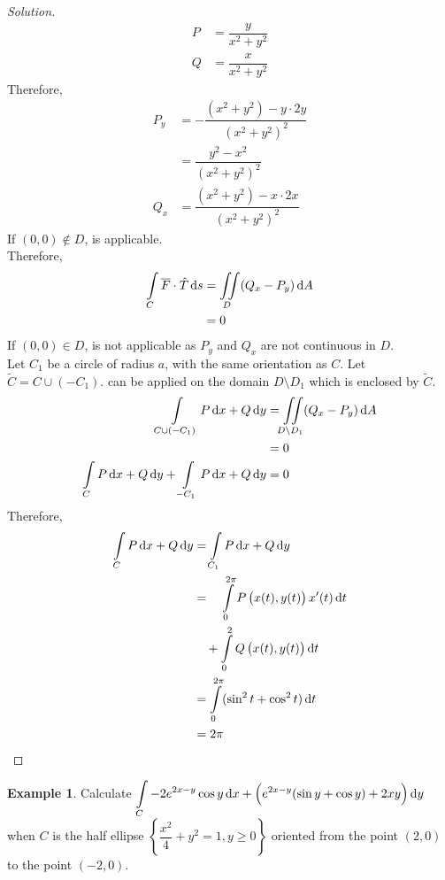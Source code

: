 \documentclass[fleqn, a4paper, 10pt]{article}
\theoremstyle{definition}
\newtheorem{example}{Example}
\theoremstyle{theorem}
\theoremstyle{remark}
\newenvironment{solution}
	{\begin{proof}[Solution]\let\qed\relax}
	{\end{proof}}
\begin{document}
\begin{multicols}{2}
\begin{solution}
	\begin{align*}
		P &= \dfrac{y}{x^2 + y^2}\\
		Q &= \dfrac{x}{x^2 + y^2}
	\end{align*}
	Therefore,
	\begin{align*}
		P_y &= -\dfrac{(x^2 + y^2) - y \cdot 2y}{(x^2 + y^2)^2}\\
		&= \dfrac{y^2 - x^2}{(x^2 + y^2)^2}\\
		Q_x &= \dfrac{(x^2 + y^2) - x \cdot 2x}{(x^2 + y^2)^2}
	\end{align*}
	If $(0,0) \notin D$,  is applicable.\\
	Therefore,
	\begin{align*}
		\int\limits_{C} \overline{F} \cdot \hat{T} \dif s &= \iint\limits_{D} (Q_x - P_y) \dif A\\
		&= 0
	\end{align*}
	If $(0,0) \in D$,  is not applicable as $P_y$ and $Q_x$ are not continuous in $D$.\\
	Let $C_1$ be a circle of radius $a$, with the same orientation as $C$. Let $\widetilde{C} = C \cup (-C_1)$.  can be applied on the domain $D \setminus D_1$ which is enclosed by $\widetilde{C}$.
	\begin{align*}
		\int\limits_{C \cup (-C_1)} P \dif x + Q \dif y &= \iint\limits_{D \setminus D_1} (Q_x - P_y) \dif A\\
		&= 0\\
		\int\limits_{C} P \dif x + Q \dif y + \int\limits_{-C_1} P \dif x + Q \dif y &= 0
	\end{align*}
	Therefore,
	\begin{align*}
		\int\limits_{C} P \dif x + Q \dif y &= \int\limits_{C_1} P \dif x + Q \dif y\\
		&= \quad \int\limits_{0}^{2 \pi} P\left( x(t), y(t) \right) x'(t) \dif t\\
		&\quad+ \int\limits_{0}^{2} Q\left( x(t), y(t) \right) \dif t\\
		&= \int\limits_{0}^{2 \pi} (\sin^2 t + \cos^2 t) \dif t\\
		&= 2 \pi
	\end{align*}
\end{solution}

\begin{example}
	Calculate $\displaystyle \int\limits_{C} -2e^{2x - y} \cos y \dif x + \left( e^{2x - y} (\sin y + \cos y) + 2xy \right) \dif y$ when $C$ is the half ellipse $\left\lbrace \dfrac{x^2}{4} + y^2 = 1, y \geq 0 \right\rbrace$ oriented from the point $(2,0)$ to the point $(-2,0)$.
\end{example}


\end{multicols}
\end{document}
